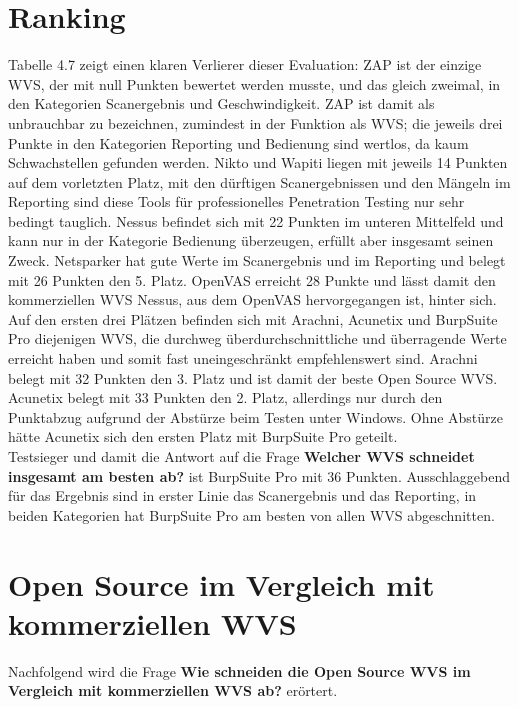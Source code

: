 \documentclass[12pt,oneside,a4paper,parskip,pointlessnumbers]{scrbook}
\begin{document}
  \section{Ranking}
  Tabelle 4.7 zeigt einen klaren Verlierer dieser Evaluation: ZAP ist der einzige WVS, der mit null Punkten bewertet werden musste, und das gleich zweimal, in den Kategorien Scanergebnis und Geschwindigkeit. ZAP ist damit als unbrauchbar zu bezeichnen, zumindest in der Funktion als WVS; die jeweils drei Punkte in den Kategorien Reporting und Bedienung sind wertlos, da kaum Schwachstellen gefunden werden. Nikto und Wapiti liegen mit jeweils 14 Punkten auf dem vorletzten Platz, mit den dürftigen Scanergebnissen und den Mängeln im Reporting sind diese Tools für professionelles Penetration Testing nur sehr bedingt tauglich. Nessus befindet sich mit 22 Punkten im unteren Mittelfeld und kann nur in der Kategorie Bedienung überzeugen, erfüllt aber insgesamt seinen Zweck. Netsparker hat gute Werte im Scanergebnis und im Reporting und belegt mit 26 Punkten den 5. Platz. OpenVAS erreicht 28 Punkte und lässt damit den kommerziellen WVS Nessus, aus dem OpenVAS hervorgegangen ist, hinter sich.
  Auf den ersten drei Plätzen befinden sich mit Arachni, Acunetix und BurpSuite Pro diejenigen WVS, die durchweg überdurchschnittliche und überragende Werte erreicht haben und somit fast uneingeschränkt empfehlenswert sind. Arachni belegt mit 32 Punkten den 3. Platz und ist damit der beste Open Source WVS.
  Acunetix belegt mit 33 Punkten den 2. Platz, allerdings nur durch den Punktabzug aufgrund der Abstürze beim Testen unter Windows. Ohne Abstürze hätte Acunetix sich den ersten Platz mit BurpSuite Pro geteilt.\\
  Testsieger und damit die Antwort auf die Frage \textbf{Welcher WVS schneidet insgesamt am besten ab?} ist BurpSuite Pro mit 36 Punkten. Ausschlaggebend für das Ergebnis sind in erster Linie das Scanergebnis und das Reporting, in beiden Kategorien hat BurpSuite Pro am besten von allen WVS abgeschnitten.

  \section{Open Source im Vergleich mit kommerziellen WVS}
  Nachfolgend wird die Frage \textbf{Wie schneiden die Open Source WVS im Vergleich mit kommerziellen WVS ab?} erörtert.
\end{document}

